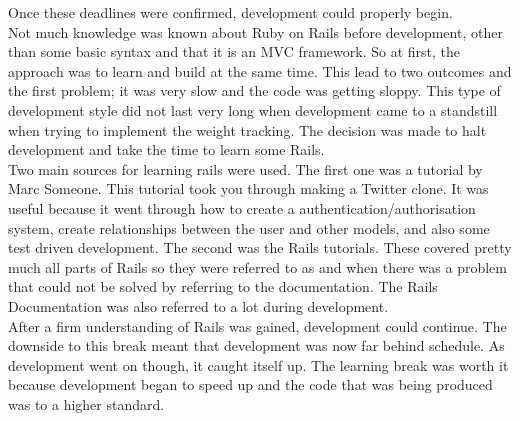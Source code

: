 \noindent
Once these deadlines were confirmed, development could properly begin.\\

Not much knowledge was known about Ruby on Rails before development, other than some basic syntax and that it is an MVC framework. So at first, the approach was to learn and build at the same time. This lead to two outcomes and the first problem; it was very slow and the code was getting sloppy. This type of development style did not last very long when development came to a standstill when trying to implement the weight tracking. The decision was made to halt development and take the time to learn some Rails.\\

Two main sources for learning rails were used. The first one was a tutorial by Marc Someone. This tutorial took you through making a Twitter \citep{twitter:2006} clone. It was useful because it went through how to create a authentication/authorisation system, create relationships between the user and other models, and also some test driven development. The second was the Rails tutorials. These covered pretty much all parts of Rails so they were referred to as and when there was a problem that could not be solved by referring to the documentation. The Rails Documentation was also referred to a lot during development.\\

After a firm understanding of Rails was gained, development could continue. The downside to this break meant that development was now far behind schedule. As development went on though, it caught itself up. The learning break was worth it because development began to speed up and the code that was being produced was to a higher standard.\\


